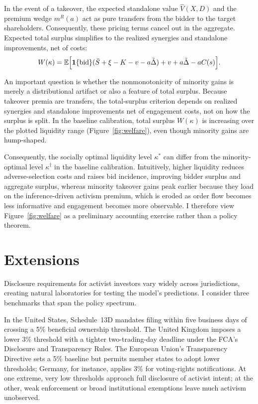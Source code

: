 \documentclass[11pt]{article}
\newcommand{\E}{\mathbb{E}}
\newcommand{\1}{\mathbf{1}}
\begin{document}
In the event of a takeover, the expected standalone value $\hat{V}(X,D)$ and the premium wedge $m^{R}(a)$ act as pure transfers from the bidder to the target shareholders. Consequently, these pricing terms cancel out in the aggregate. Expected total surplus simplifies to the realized synergies and standalone improvements, net of costs:
\begin{equation}
W(\kappa) = \E\Bigl[ \1\{\text{bid}\} (\bar{S} + \xi - K - v - a\tilde{\Delta}) + v + a\tilde{\Delta} - a C(s) \Bigr].
\end{equation}

An important question is whether the nonmonotonicity of minority gains is merely a distributional artifact or also a feature of total surplus. Because takeover premia are transfers, the total-surplus criterion depends on realized synergies and standalone improvements net of engagement costs, not on how the surplus is split. In the baseline calibration, total surplus $W(\kappa)$ is increasing over the plotted liquidity range (Figure~\ref{fig:welfare}), even though minority gains are hump-shaped.

Consequently, the socially optimal liquidity level $\kappa^*$ can differ from the minority-optimal level $\kappa^\dagger$ in the baseline calibration. Intuitively, higher liquidity reduces adverse-selection costs and raises bid incidence, improving bidder surplus and aggregate surplus, whereas minority takeover gains peak earlier because they load on the inference-driven activism premium, which is eroded as order flow becomes less informative and engagement becomes more observable. I therefore view Figure~\ref{fig:welfare} as a preliminary accounting exercise rather than a policy theorem.

\section{Extensions}
\label{sec:extensions}

Disclosure requirements for activist investors vary widely across jurisdictions, creating natural laboratories for testing the model's predictions. I consider three benchmarks that span the policy spectrum.

In the United States, Schedule~13D mandates filing within five business days of crossing a 5\% beneficial ownership threshold. The United Kingdom imposes a lower 3\% threshold with a tighter two-trading-day deadline under the FCA's Disclosure and Transparency Rules. The European Union's Transparency Directive sets a 5\% baseline but permits member states to adopt lower thresholds; Germany, for instance, applies 3\% for voting-rights notifications. At one extreme, very low thresholds approach full disclosure of activist intent; at the other, weak enforcement or broad institutional exemptions leave much activism unobserved.
\end{document}
